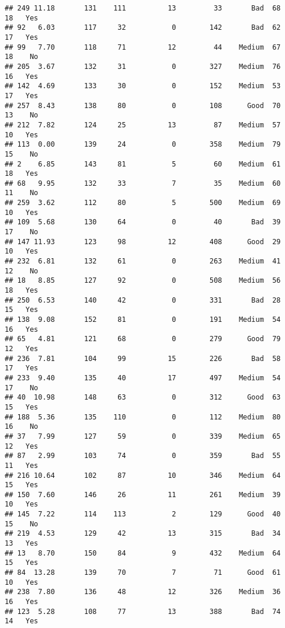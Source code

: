 \documentclass[
]{article}
\begin{document}
\begin{verbatim}
## 249 11.18       131    111          13         33       Bad  68        18   Yes
## 92   6.03       117     32           0        142       Bad  62        17   Yes
## 99   7.70       118     71          12         44    Medium  67        18    No
## 205  3.67       132     31           0        327    Medium  76        16   Yes
## 142  4.69       133     30           0        152    Medium  53        17   Yes
## 257  8.43       138     80           0        108      Good  70        13    No
## 212  7.82       124     25          13         87    Medium  57        10   Yes
## 113  0.00       139     24           0        358    Medium  79        15    No
## 2    6.85       143     81           5         60    Medium  61        18   Yes
## 68   9.95       132     33           7         35    Medium  60        11    No
## 259  3.62       112     80           5        500    Medium  69        10   Yes
## 109  5.68       130     64           0         40       Bad  39        17    No
## 147 11.93       123     98          12        408      Good  29        10   Yes
## 232  6.81       132     61           0        263    Medium  41        12    No
## 18   8.85       127     92           0        508    Medium  56        18   Yes
## 250  6.53       140     42           0        331       Bad  28        15   Yes
## 138  9.08       152     81           0        191    Medium  54        16   Yes
## 65   4.81       121     68           0        279      Good  79        12   Yes
## 236  7.81       104     99          15        226       Bad  58        17   Yes
## 233  9.40       135     40          17        497    Medium  54        17    No
## 40  10.98       148     63           0        312      Good  63        15   Yes
## 188  5.36       135    110           0        112    Medium  80        16    No
## 37   7.99       127     59           0        339    Medium  65        12   Yes
## 87   2.99       103     74           0        359       Bad  55        11   Yes
## 216 10.64       102     87          10        346    Medium  64        15   Yes
## 150  7.60       146     26          11        261    Medium  39        10   Yes
## 145  7.22       114    113           2        129      Good  40        15    No
## 219  4.53       129     42          13        315       Bad  34        13   Yes
## 13   8.70       150     84           9        432    Medium  64        15   Yes
## 84  13.28       139     70           7         71      Good  61        10   Yes
## 238  7.80       136     48          12        326    Medium  36        16   Yes
## 123  5.28       108     77          13        388       Bad  74        14   Yes

\end{verbatim}
\end{document}
